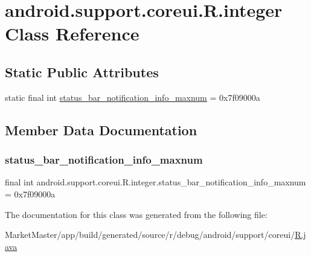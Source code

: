 \hypertarget{classandroid_1_1support_1_1coreui_1_1R_1_1integer}{}\section{android.\+support.\+coreui.\+R.\+integer Class Reference}
\label{classandroid_1_1support_1_1coreui_1_1R_1_1integer}
\subsection*{Static Public Attributes}
\begin{DoxyCompactItemize}
\item 
static final int \mbox{\hyperlink{classandroid_1_1support_1_1coreui_1_1R_1_1integer_ae25c73a19ff7780a6f36e92aa4d65ea4}{status\+\_\+bar\+\_\+notification\+\_\+info\+\_\+maxnum}} = 0x7f09000a
\end{DoxyCompactItemize}


\subsection{Member Data Documentation}
\mbox{\label{classandroid_1_1support_1_1coreui_1_1R_1_1integer_ae25c73a19ff7780a6f36e92aa4d65ea4}} 
\subsubsection{\texorpdfstring{status\+\_\+bar\+\_\+notification\+\_\+info\+\_\+maxnum}{status\_bar\_notification\_info\_maxnum}}
{\footnotesize\ttfamily final int android.\+support.\+coreui.\+R.\+integer.\+status\+\_\+bar\+\_\+notification\+\_\+info\+\_\+maxnum = 0x7f09000a\hspace{0.3cm}{\ttfamily [static]}}



The documentation for this class was generated from the following file\+:\begin{DoxyCompactItemize}
\item 
Market\+Master/app/build/generated/source/r/debug/android/support/coreui/\mbox{\hyperlink{debug_2android_2support_2coreui_2R_8java}{R.\+java}}\end{DoxyCompactItemize}
